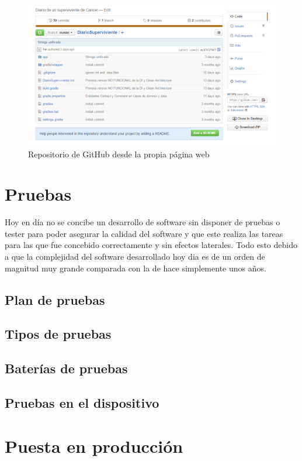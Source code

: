 \documentclass[../pfc.tex]{subfiles}
\begin{document}
	\begin{figure}[H]
		\centering
		\includegraphics[width=1\linewidth]{../images/githubDiarioSuperviviente}
		\caption{Repositorio de GitHub desde la propia página web }
		\label{fig:ghweb}
	\end{figure}

	\clearpage
	
	\section{Pruebas}
	
	Hoy en día no se concibe un desarrollo de software sin disponer de pruebas o tester para poder asegurar la calidad del software y que este realiza las tareas para las que fue concebido correctamente y sin efectos laterales. Todo esto debido a que la complejidad del software desarrollado hoy dia es de un orden de magnitud muy grande comparada con la de hace simplemente unos años.
	
	\subsection{Plan de pruebas}
	
	\subsection{Tipos de pruebas}
		
	\subsection{Baterías de pruebas}
		
	\subsection{Pruebas en el dispositivo}
	
	\section{Puesta en producción}
	
\end{document}
